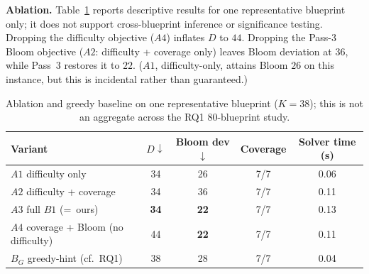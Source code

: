 \documentclass[runningheads]{llncs}
\begin{document}
\noindent\textbf{Ablation.} Table~\ref{tab:ablate} reports descriptive results for one representative blueprint only; it does not support cross-blueprint inference or significance testing.
Dropping the difficulty objective ($A4$) inflates $D$ to $44$. Dropping the Pass-3 Bloom objective ($A2$: difficulty + coverage only) leaves Bloom deviation at $36$, while Pass~3 restores it to $22$.
($A1$, difficulty-only, attains Bloom $26$ on this instance, but this is incidental rather than guaranteed.)

\begin{table}[t]
\caption{Ablation and greedy baseline on one representative blueprint ($K{=}38$);
this is not an aggregate across the RQ1 80-blueprint study.}
\label{tab:ablate}
\centering
\small
\begin{tabular}{lcccc}
\toprule
\textbf{Variant} & $D\downarrow$ & \textbf{Bloom dev}$\downarrow$ & \textbf{Coverage} & \textbf{Solver time (s)} \\
\midrule
$A1$ difficulty only            & 34 & 26 & 7/7 & 0.06 \\
$A2$ difficulty + coverage      & 34 & 36 & 7/7 & 0.11 \\
$A3$ full $B1$ (=~ours)         & \textbf{34} & \textbf{22} & 7/7 & 0.13 \\
$A4$ coverage + Bloom (no difficulty) & 44 & \textbf{22} & 7/7 & 0.11 \\
$B_G$ greedy-hint (cf.\ RQ1)    & 38 & 28 & 7/7 & 0.04 \\
\bottomrule
\end{tabular}
\end{table}
\end{document}

